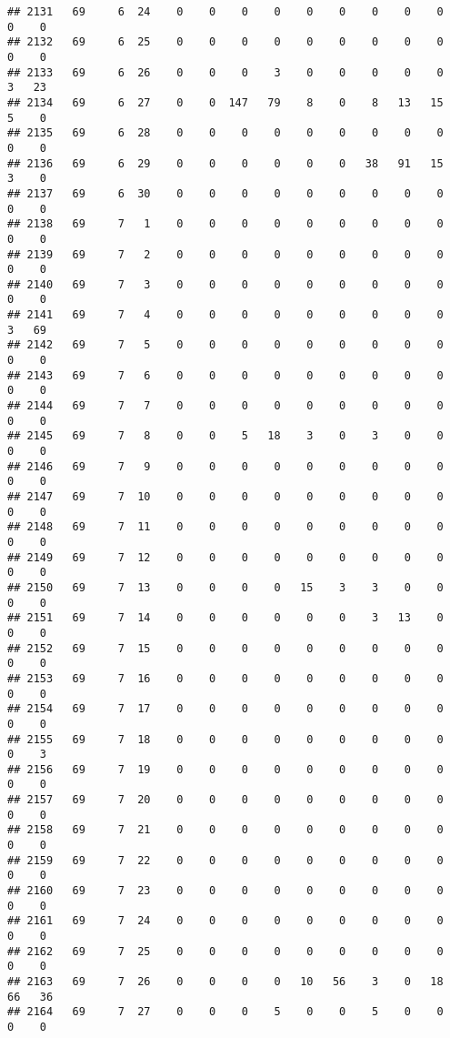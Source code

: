 \documentclass[]{article}
\begin{document}
\begin{verbatim}
## 2131   69     6  24    0    0    0    0    0    0    0    0    0    0    0
## 2132   69     6  25    0    0    0    0    0    0    0    0    0    0    0
## 2133   69     6  26    0    0    0    3    0    0    0    0    0    3   23
## 2134   69     6  27    0    0  147   79    8    0    8   13   15    5    0
## 2135   69     6  28    0    0    0    0    0    0    0    0    0    0    0
## 2136   69     6  29    0    0    0    0    0    0   38   91   15    3    0
## 2137   69     6  30    0    0    0    0    0    0    0    0    0    0    0
## 2138   69     7   1    0    0    0    0    0    0    0    0    0    0    0
## 2139   69     7   2    0    0    0    0    0    0    0    0    0    0    0
## 2140   69     7   3    0    0    0    0    0    0    0    0    0    0    0
## 2141   69     7   4    0    0    0    0    0    0    0    0    0    3   69
## 2142   69     7   5    0    0    0    0    0    0    0    0    0    0    0
## 2143   69     7   6    0    0    0    0    0    0    0    0    0    0    0
## 2144   69     7   7    0    0    0    0    0    0    0    0    0    0    0
## 2145   69     7   8    0    0    5   18    3    0    3    0    0    0    0
## 2146   69     7   9    0    0    0    0    0    0    0    0    0    0    0
## 2147   69     7  10    0    0    0    0    0    0    0    0    0    0    0
## 2148   69     7  11    0    0    0    0    0    0    0    0    0    0    0
## 2149   69     7  12    0    0    0    0    0    0    0    0    0    0    0
## 2150   69     7  13    0    0    0    0   15    3    3    0    0    0    0
## 2151   69     7  14    0    0    0    0    0    0    3   13    0    0    0
## 2152   69     7  15    0    0    0    0    0    0    0    0    0    0    0
## 2153   69     7  16    0    0    0    0    0    0    0    0    0    0    0
## 2154   69     7  17    0    0    0    0    0    0    0    0    0    0    0
## 2155   69     7  18    0    0    0    0    0    0    0    0    0    0    3
## 2156   69     7  19    0    0    0    0    0    0    0    0    0    0    0
## 2157   69     7  20    0    0    0    0    0    0    0    0    0    0    0
## 2158   69     7  21    0    0    0    0    0    0    0    0    0    0    0
## 2159   69     7  22    0    0    0    0    0    0    0    0    0    0    0
## 2160   69     7  23    0    0    0    0    0    0    0    0    0    0    0
## 2161   69     7  24    0    0    0    0    0    0    0    0    0    0    0
## 2162   69     7  25    0    0    0    0    0    0    0    0    0    0    0
## 2163   69     7  26    0    0    0    0   10   56    3    0   18   66   36
## 2164   69     7  27    0    0    0    5    0    0    5    0    0    0    0

\end{verbatim}
\end{document}
